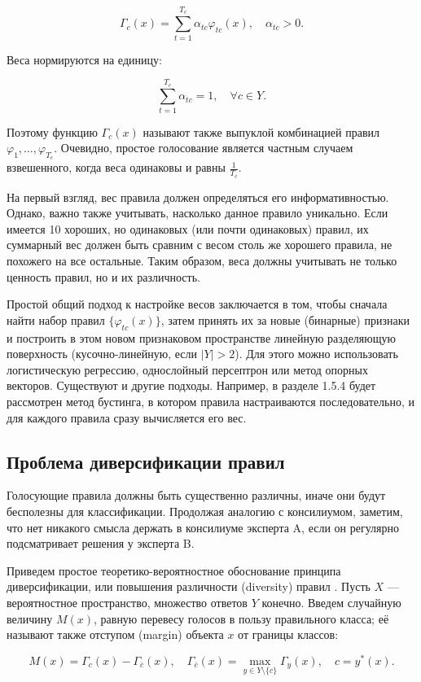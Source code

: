\[
\Gamma_c(x) = \sum_{t=1}^{T_c} \alpha_{tc} \varphi_{tc}(x), \quad \alpha_{tc} > 0.
\]

Веса нормируются на единицу:

\[
\sum_{t=1}^{T_c} \alpha_{tc} = 1, \quad \forall c \in Y.
\]

Поэтому функцию $\Gamma_c(x)$ называют также выпуклой комбинацией правил $\varphi_1, \dots, \varphi_{T_c}$. Очевидно, простое голосование является частным случаем взвешенного, когда веса одинаковы и равны $\frac{1}{T_c}$.

На первый взгляд, вес правила должен определяться его информативностью. Однако, важно также учитывать, насколько данное правило уникально. Если имеется 10 хороших, но одинаковых (или почти одинаковых) правил, их суммарный вес должен быть сравним с весом столь же хорошего правила, не похожего на все остальные. Таким образом, веса должны учитывать не только ценность правил, но и их различность.

Простой общий подход к настройке весов заключается в том, чтобы сначала найти набор правил $\{ \varphi_{tc}(x) \}$, затем принять их за новые (бинарные) признаки и построить в этом новом признаковом пространстве линейную разделяющую поверхность (кусочно-линейную, если $|Y| > 2$). Для этого можно использовать логистическую регрессию, однослойный персептрон или метод опорных векторов. Существуют и другие подходы. Например, в разделе 1.5.4 будет рассмотрен метод бустинга, в котором правила настраиваются последовательно, и для каждого правила сразу вычисляется его вес.

\subsection{Проблема диверсификации правил}
Голосующие правила должны быть существенно различны, иначе они будут бесполезны для классификации. Продолжая аналогию с консилиумом, заметим, что нет никакого смысла держать в консилиуме эксперта A, если он регулярно подсматривает решения у эксперта B.

Приведем простое теоретико-вероятностное обоснование принципа диверсификации, или повышения различности (diversity) правил \cite{14}. Пусть $X$ — вероятностное пространство, множество ответов $Y$ конечно. Введем случайную величину $M(x)$, равную перевесу голосов в пользу правильного класса; её называют также отступом (margin) объекта $x$ от границы классов:

\[
M(x) = \Gamma_c(x) - \Gamma_{\overline{c}}(x), \quad \Gamma_{\overline{c}}(x) = \max_{y \in Y \setminus \{c\}} \Gamma_y(x), \quad c = y^*(x).
\]

